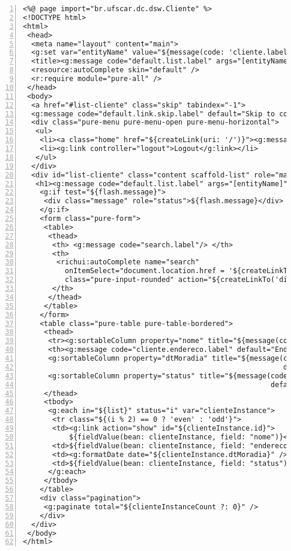 \begin{lstlisting}[numbers=left,  caption=Visão  {\bf cliente/index.gsp},  frame
    =trBL,float=htbp, label=codCliIndex2]
<%@ page import="br.ufscar.dc.dsw.Cliente" %>
<!DOCTYPE html>
<html>
 <head>
  <meta name="layout" content="main">
  <g:set var="entityName" value="${message(code: 'cliente.label', default: 'Cliente')}" />
  <title><g:message code="default.list.label" args="[entityName]" /></title>
  <resource:autoComplete skin="default" />
  <r:require module="pure-all" />
 </head>
 <body>
  <a href="#list-cliente" class="skip" tabindex="-1">
  <g:message code="default.link.skip.label" default="Skip to content&hellip;"/></a>
  <div class="pure-menu pure-menu-open pure-menu-horizontal">
   <ul>
    <li><a class="home" href="${createLink(uri: '/')}"><g:message code="default.home.label"/></a></li>
    <li><g:link controller="logout">Logout</g:link></li>
   </ul>
  </div>
  <div id="list-cliente" class="content scaffold-list" role="main">
   <h1><g:message code="default.list.label" args="[entityName]" /></h1>
    <g:if test="${flash.message}">
     <div class="message" role="status">${flash.message}</div>
    </g:if>
    <form class="pure-form">
     <table>
      <thead>
       <th> <g:message code="search.label"/> </th>
       <th>
        <richui:autoComplete name="search"
          onItemSelect="document.location.href = '${createLinkTo(dir: 'cliente/show')}/' + id;" 
          class="pure-input-rounded" action="${createLinkTo('dir': 'cliente/searchAJAX')}"/>
       </th>
      </thead> 
     </table>
    </form>
    <table class="pure-table pure-table-bordered">
     <thead>
      <tr><g:sortableColumn property="nome" title="${message(code: 'cliente.nome.label', default: 'Nome')}" />
      <th><g:message code="cliente.endereco.label" default="Endereco" /></th>
      <g:sortableColumn property="dtMoradia" title="${message(code: 'cliente.dtMoradia.label', 
                                                              default: 'Dt Moradia')}" />
      <g:sortableColumn property="status" title="${message(code: 'cliente.status.label', 
                                                           default: 'Status')}" /></tr>
     </thead>
     <tbody>
      <g:each in="${list}" status="i" var="clienteInstance">
       <tr class="${(i % 2) == 0 ? 'even' : 'odd'}">
       <td><g:link action="show" id="${clienteInstance.id}">
           ${fieldValue(bean: clienteInstance, field: "nome")}</g:link></td>
       <td>${fieldValue(bean: clienteInstance, field: "endereco")}</td>
       <td><g:formatDate date="${clienteInstance.dtMoradia}" /></td>
       <td>${fieldValue(bean: clienteInstance, field: "status")}</td></tr>
      </g:each>
     </tbody>
    </table>
    <div class="pagination">
     <g:paginate total="${clienteInstanceCount ?: 0}" />
    </div>
  </div>
 </body>
</html>
\end{lstlisting}

